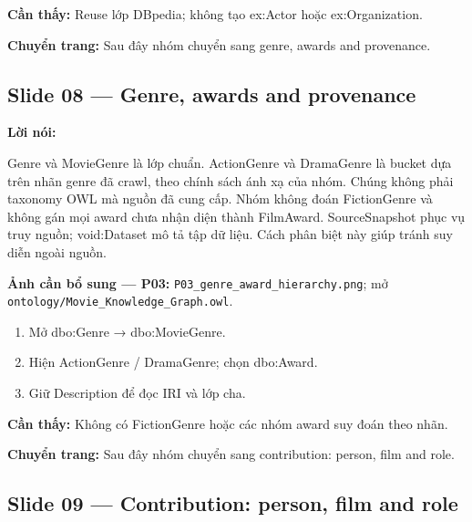 \documentclass[
  11pt,
]{article}
\providecommand{\tightlist}{%
  \setlength{\itemsep}{0pt}\setlength{\parskip}{0pt}}
\begin{document}
\textbf{Cần thấy:} Reuse lớp DBpedia; không tạo ex:Actor hoặc
ex:\allowbreak{}\allowbreak{}Organ\allowbreak{}ization.\allowbreak{}

\textbf{Chuyển trang:} Sau đây nhóm chuyển sang genre, awards and
provenance.

\subsection{Slide 08 --- Genre, awards and
provenance}\label{slide-08-genre-awards-and-provenance}

\textbf{Lời nói:}

Genre và MovieGenre là lớp chuẩn. ActionGenre và DramaGenre là bucket
dựa trên nhãn genre đã crawl, theo chính sách ánh xạ của nhóm. Chúng
không phải taxonomy OWL mà nguồn đã cung cấp. Nhóm không đoán
FictionGenre và không gán mọi award chưa nhận diện thành FilmAward.
Source\allowbreak{}Sn\allowbreak{}apshot phục vụ truy nguồn;
void:Dataset mô tả tập dữ liệu. Cách phân biệt này giúp tránh suy diễn
ngoài nguồn.

\textbf{Ảnh cần bổ sung --- P03:}
\texttt{P03\_\allowbreak{}genr\allowbreak{}e\_\allowbreak{}award\_\allowbreak{}hierarch\allowbreak{}y.\allowbreak{}png};
mở
\texttt{ontology\allowbreak{}/\allowbreak{}\allowbreak{}Movie\_\allowbreak{}\allowbreak{}K\allowbreak{}nowledge\allowbreak{}\_\allowbreak{}\allowbreak{}Graph.\allowbreak{}o\allowbreak{}wl}.

\begin{enumerate}
\def\labelenumi{\arabic{enumi}.}
\tightlist
\item
  Mở dbo:Genre →
  dbo:\allowbreak{}\allowbreak{}Movi\allowbreak{}e\allowbreak{}Genre.\allowbreak{}
\item
  Hiện ActionGenre / DramaGenre; chọn dbo:Award.
\item
  Giữ Description để đọc IRI và lớp cha.
\end{enumerate}

\textbf{Cần thấy:} Không có FictionGenre hoặc các nhóm award suy đoán
theo nhãn.

\textbf{Chuyển trang:} Sau đây nhóm chuyển sang
contribu\allowbreak{}tion:\allowbreak{} person, film and role.

\subsection{\texorpdfstring{Slide 09 ---
Contribu\allowbreak{}tion:\allowbreak{} person, film and
role}{Slide 09 ---  person, film and role}}\label{slide-09-contribution-person-film-and-role}
\end{document}
